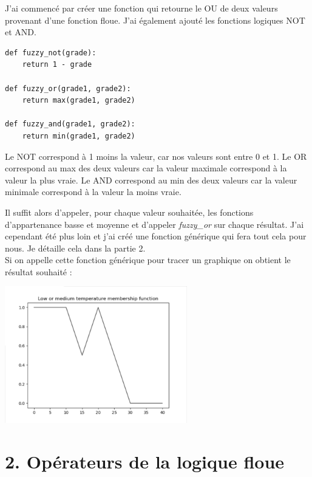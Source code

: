 \documentclass[11pt]{report}
\begin{document}
J'ai commencé par créer une fonction qui retourne le OU de deux valeurs provenant d'une fonction floue. J'ai également ajouté les fonctions logiques NOT et AND.
\begin{verbatim}
def fuzzy_not(grade):
    return 1 - grade

def fuzzy_or(grade1, grade2):
    return max(grade1, grade2)

def fuzzy_and(grade1, grade2):
    return min(grade1, grade2)
\end{verbatim}
Le NOT correspond à 1 moins la valeur, car nos valeurs sont entre 0 et 1.
Le OR correspond au max des deux valeurs car la valeur maximale correspond à la valeur la plus vraie.
Le AND correspond au min des deux valeurs car la valeur minimale correspond à la valeur la moins vraie.

Il suffit alors d'appeler, pour chaque valeur souhaitée, les fonctions d'appartenance basse et moyenne et d'appeler \textit{fuzzy\_or} sur chaque résultat. J'ai cependant été plus loin et j'ai créé une fonction générique qui fera tout cela pour nous. Je détaille cela dans la partie 2.\\
Si on appelle cette fonction générique pour tracer un graphique on obtient le résultat souhaité :
\begin{center}
\includegraphics[width=300px]{low_or_medium}
\end{center}

\section*{2. Opérateurs de la logique floue}
\end{document}
